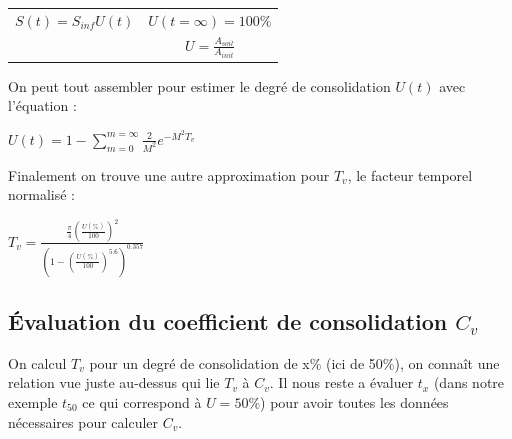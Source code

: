 \medskip
\begin{center}
\begin{tabular}{c|c}
    $S(t) = S_{inf} U(t) $ \quad &   $ U(t=\infty) =100\% $  \\
     &  $ U = \frac{A_{soil}}{A_{init}} $ 
\end{tabular}
\end{center}
\medskip 

On peut tout assembler pour estimer le degré de consolidation $U(t)$ avec l'équation : 

\medskip
\begin{center}
$ U(t) = 1 - \sum_{m = 0}^{m = \infty} \frac{2}{M^2} e^{-M^2T_v} $
\end{center}
\medskip

Finalement on trouve une autre approximation pour $T_v$, le facteur temporel normalisé :

\medskip 
\begin{center}
    $ T_v = \frac{\frac{\pi}{4} (\frac{U(\%)}{100})^2}{(1-(\frac{U(\%)}{100})^{5.6})^{0.357}} $
\end{center}
\subsection{Évaluation du coefficient de consolidation $C_v$}

    On calcul $T_v$ pour un degré de consolidation de x\% (ici de 50\%), on connaît une relation vue juste au-dessus qui lie $T_v$ à $C_v$. Il nous reste a évaluer $t_x$ (dans notre exemple $t_{50}$ ce qui correspond à $ U = 50\% $) pour avoir toutes les données nécessaires pour calculer $C_v$.
    \medskip 
    
